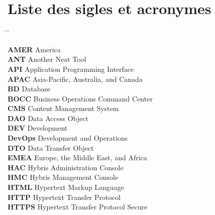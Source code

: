 \chapter{Liste des sigles et acronymes}

\begin{tabbing}
    \hspace{3cm} \= \hspace{7cm} \= \kill

    \textbf{AMER} \> America \\
    
    \textbf{ANT} \> Another Neat Tool \\
    
    \textbf{API} \> Application Programming Interface \\
    
    \textbf{APAC} \> Asia-Pacific, Australia, and Canada \\
    
    \textbf{BD} \> Database \\
    
    \textbf{BOCC} \> Business Operations Command Center \\
    
    \textbf{CMS} \> Content Management System \\
    
    \textbf{DAO} \> Data Access Object \\
    
    \textbf{DEV} \> Development \\
    
    \textbf{DevOps} \> Development and Operations \\
    
    \textbf{DTO} \> Data Transfer Object \\
    
    \textbf{EMEA} \> Europe, the Middle East, and Africa \\
    
    \textbf{HAC} \> Hybris Administration Console \\
    
    \textbf{HMC} \> Hybris Management Console \\
    
    \textbf{HTML} \> Hypertext Markup Language \\
    
    \textbf{HTTP} \> Hypertext Transfer Protocol \\
    
    \textbf{HTTPS} \> Hypertext Transfer Protocol Secure \\
    

\end{tabbing}
